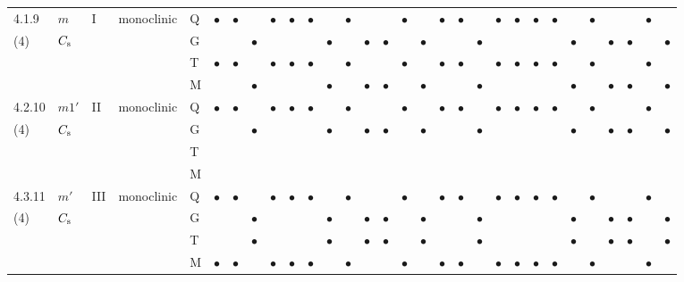 \documentclass[fleqn,9pt,landscape]{jsarticle}
\begin{document}
\begin{longtable}{lllll|l|lll|ll|lll|l|lll|lll|l|ll|lll|lll}
4.1.9 & \texttt{$m$} & I & monoclinic & Q & $\bullet$ & $\bullet$ &  & $\bullet$ & $\bullet$ & $\bullet$ &  & $\bullet$ &  &  & $\bullet$ &  & $\bullet$ & $\bullet$ &  & $\bullet$ & $\bullet$ & $\bullet$ & $\bullet$ &  & $\bullet$ &  &  & $\bullet$ &  \\
(4) & $C_{\rm s}$ &  &  & G &  &  & $\bullet$ &  &  &  & $\bullet$ &  & $\bullet$ & $\bullet$ &  & $\bullet$ &  &  & $\bullet$ &  &  &  &  & $\bullet$ &  & $\bullet$ & $\bullet$ &  & $\bullet$ \\
 &  &  &  & T & $\bullet$ & $\bullet$ &  & $\bullet$ & $\bullet$ & $\bullet$ &  & $\bullet$ &  &  & $\bullet$ &  & $\bullet$ & $\bullet$ &  & $\bullet$ & $\bullet$ & $\bullet$ & $\bullet$ &  & $\bullet$ &  &  & $\bullet$ &  \\
 &  &  &  & M &  &  & $\bullet$ &  &  &  & $\bullet$ &  & $\bullet$ & $\bullet$ &  & $\bullet$ &  &  & $\bullet$ &  &  &  &  & $\bullet$ &  & $\bullet$ & $\bullet$ &  & $\bullet$ \\ \hline
4.2.10 & \texttt{$m1'$} & II & monoclinic & Q & $\bullet$ & $\bullet$ &  & $\bullet$ & $\bullet$ & $\bullet$ &  & $\bullet$ &  &  & $\bullet$ &  & $\bullet$ & $\bullet$ &  & $\bullet$ & $\bullet$ & $\bullet$ & $\bullet$ &  & $\bullet$ &  &  & $\bullet$ &  \\
(4) & $C_{\rm s}$ &  &  & G &  &  & $\bullet$ &  &  &  & $\bullet$ &  & $\bullet$ & $\bullet$ &  & $\bullet$ &  &  & $\bullet$ &  &  &  &  & $\bullet$ &  & $\bullet$ & $\bullet$ &  & $\bullet$ \\
 &  &  &  & T &  &  &  &  &  &  &  &  &  &  &  &  &  &  &  &  &  &  &  &  &  &  &  &  &  \\
 &  &  &  & M &  &  &  &  &  &  &  &  &  &  &  &  &  &  &  &  &  &  &  &  &  &  &  &  &  \\ \hline
4.3.11 & \texttt{$m'$} & III & monoclinic & Q & $\bullet$ & $\bullet$ &  & $\bullet$ & $\bullet$ & $\bullet$ &  & $\bullet$ &  &  & $\bullet$ &  & $\bullet$ & $\bullet$ &  & $\bullet$ & $\bullet$ & $\bullet$ & $\bullet$ &  & $\bullet$ &  &  & $\bullet$ &  \\
(4) & $C_{\rm s}$ &  &  & G &  &  & $\bullet$ &  &  &  & $\bullet$ &  & $\bullet$ & $\bullet$ &  & $\bullet$ &  &  & $\bullet$ &  &  &  &  & $\bullet$ &  & $\bullet$ & $\bullet$ &  & $\bullet$ \\
 &  &  &  & T &  &  & $\bullet$ &  &  &  & $\bullet$ &  & $\bullet$ & $\bullet$ &  & $\bullet$ &  &  & $\bullet$ &  &  &  &  & $\bullet$ &  & $\bullet$ & $\bullet$ &  & $\bullet$ \\
 &  &  &  & M & $\bullet$ & $\bullet$ &  & $\bullet$ & $\bullet$ & $\bullet$ &  & $\bullet$ &  &  & $\bullet$ &  & $\bullet$ & $\bullet$ &  & $\bullet$ & $\bullet$ & $\bullet$ & $\bullet$ &  & $\bullet$ &  &  & $\bullet$ &  \\ \hline

\end{longtable}
\end{document}
